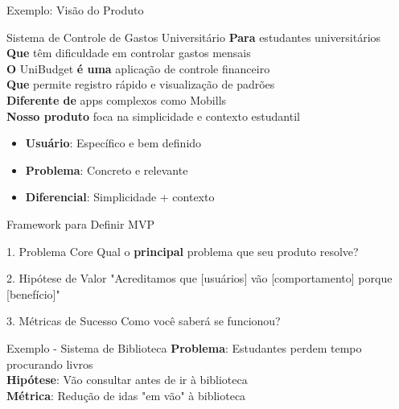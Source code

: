 \documentclass[10pt]{beamer}
\begin{document}
\begin{frame}{Exemplo: Visão do Produto}
\begin{alertblock}{Sistema de Controle de Gastos Universitário}
\textbf{Para} estudantes universitários \\
\textbf{Que} têm dificuldade em controlar gastos mensais \\
\textbf{O} UniBudget \textbf{é uma} aplicação de controle financeiro \\
\textbf{Que} permite registro rápido e visualização de padrões \\
\textbf{Diferente de} apps complexos como Mobills \\
\textbf{Nosso produto} foca na simplicidade e contexto estudantil
\end{alertblock}

\vspace{0.3cm}
\begin{itemize}
    \item \textbf{Usuário}: Específico e bem definido
    \item \textbf{Problema}: Concreto e relevante
    \item \textbf{Diferencial}: Simplicidade + contexto
\end{itemize}
\end{frame}



\begin{frame}{Framework para Definir MVP}
\begin{block}{1. Problema Core}
Qual o \textbf{principal} problema que seu produto resolve?
\end{block}

\begin{block}{2. Hipótese de Valor}
"Acreditamos que [usuários] vão [comportamento] porque [benefício]"
\end{block}

\begin{block}{3. Métricas de Sucesso}
Como você saberá se funcionou?
\end{block}

\vspace{0.3cm}
\begin{exampleblock}{Exemplo - Sistema de Biblioteca}
\textbf{Problema}: Estudantes perdem tempo procurando livros \\
\textbf{Hipótese}: Vão consultar antes de ir à biblioteca \\
\textbf{Métrica}: Redução de idas "em vão" à biblioteca
\end{exampleblock}
\end{frame}
\end{document}
